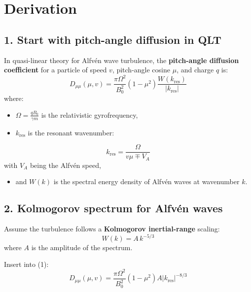 \section*{\texorpdfstring{\textbf{Derivation}}{}}

\hrulefill

\subsection*{1. \textbf{Start with pitch-angle diffusion in QLT}}

In quasi-linear theory for Alfvén wave turbulence, the \textbf{pitch-angle diffusion coefficient} for a particle of speed $v$, pitch-angle cosine $\mu$, and charge $q$ is:
\begin{equation}
D_{\mu\mu}(\mu, v) = \frac{\pi \Omega^2}{B_0^2} (1 - \mu^2) \frac{W(k_{\text{res}})}{|k_{\text{res}}|}
\tag{1}
\end{equation}
where:
\begin{itemize}
    \item $\Omega = \frac{q B_0}{\gamma m}$ is the relativistic gyrofrequency,
    \item $k_{\text{res}}$ is the resonant wavenumber:
\end{itemize}
\begin{equation}
k_{\text{res}} = \frac{\Omega}{v \mu \mp V_A}
\end{equation}
with $V_A$ being the Alfvén speed,

\begin{itemize}
    \item and $W(k)$ is the spectral energy density of Alfvén waves at wavenumber $k$.
\end{itemize}

\hrulefill

\subsection*{2. \textbf{Kolmogorov spectrum for Alfvén waves}}

Assume the turbulence follows a \textbf{Kolmogorov inertial-range} scaling:
\begin{equation}
W(k) = A\,k^{-5/3}
\tag{2}
\end{equation}
where $A$ is the amplitude of the spectrum.

Insert into (1):
\begin{equation}
D_{\mu\mu}(\mu, v) = \frac{\pi \Omega^2}{B_0^2} (1 - \mu^2) A |k_{\text{res}}|^{-8/3}
\tag{3}
\end{equation}

